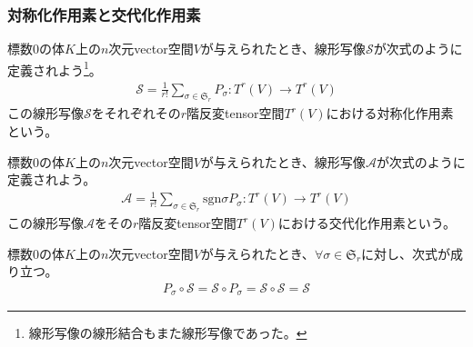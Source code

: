 \documentclass[dvipdfmx]{jsarticle}
\begin{document}
\subsubsection{対称化作用素と交代化作用素}%
\begin{dfn}
標数$0$の体$K$上の$n$次元vector空間$V$が与えられたとき、線形写像$\mathcal{S}$が次式のように定義されよう\footnote{線形写像の線形結合もまた線形写像であった。}。
\begin{align*}
\mathcal{S}=\frac{1}{r!}\sum_{\sigma \in \mathfrak{S}_{r}} P_{\sigma}:T^{r}(V) \rightarrow T^{r}(V)
\end{align*}
この線形写像$\mathcal{S}$をそれぞれその$r$階反変tensor空間$T^{r}(V)$における対称化作用素という。
\end{dfn}
\begin{dfn}
標数$0$の体$K$上の$n$次元vector空間$V$が与えられたとき、線形写像$\mathcal{A}$が次式のように定義されよう。
\begin{align*}
\mathcal{A}=\frac{1}{r!}\sum_{\sigma \in \mathfrak{S}_{r}} {\mathrm{sgn}\sigma P_{\sigma}}:T^{r}(V) \rightarrow T^{r}(V)
\end{align*}
この線形写像$\mathcal{A}$をその$r$階反変tensor空間$T^{r}(V)$における交代化作用素という。
\end{dfn}
\begin{thm}\label{2.4.8.9}
標数$0$の体$K$上の$n$次元vector空間$V$が与えられたとき、$\forall\sigma \in \mathfrak{S}_{r}$に対し、次式が成り立つ。
\begin{align*}
P_{\sigma}\circ \mathcal{S} = \mathcal{S} \circ P_{\sigma} =\mathcal{S} \circ \mathcal{S} = \mathcal{S}
\end{align*}
\end{thm}
\end{document}
